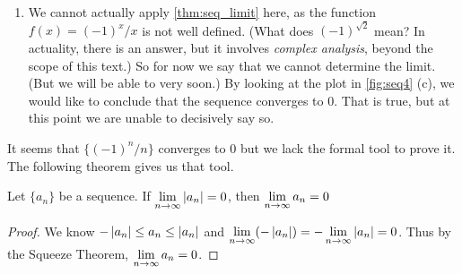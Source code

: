 \begin{example}
\begin{enumerate}
\item		We cannot actually apply \autoref{thm:seq_limit} here, as the function $f(x) = (-1)^x/x$ is not well defined. (What does $(-1)^{\sqrt{2}}$ mean? In actuality, there is an answer, but it involves \emph{complex analysis}, beyond the scope of this text.) So for now we say that we cannot determine the limit. (But we will be able to very soon.) By looking at the plot in \autoref{fig:seq4} (c), we would like to conclude that the sequence converges to 0. That is true, but at this point we are unable to decisively say so.
\end{enumerate}
\end{example}

It seems that  %
$\{(-1)^n/n\}$ converges to 0 but we lack the formal tool to prove it. The following theorem gives us that tool.

\begin{theorem}\label{thm:abs_val_seq}%
Let $\{a_n\}$ be a sequence. If $\displaystyle \lim_{n\to\infty}\left\lvert a_n \right\rvert= 0$, then $\displaystyle \lim_{n\to\infty} a_n = 0$
\end{theorem}

\begin{proof}
We know $-\left\lvert a_n \right\rvert\leq a_n\leq\left\lvert a_n \right\rvert$ and $\displaystyle \lim_{n\to \infty} (-\left\lvert a_n \right\rvert)=-\lim_{n\to\infty}\left\lvert a_n \right\rvert=0$. Thus by the Squeeze Theorem, $\displaystyle \lim_{n\to\infty} a_n =0$.
\end{proof}

